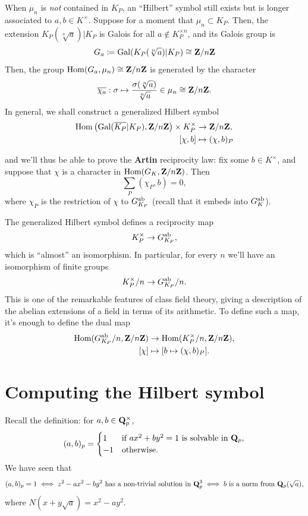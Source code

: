 \documentclass{article}
\begin{document}
When $\mu_n$ is \textit{not} contained in $K_P$, an ``Hilbert'' symbol still exists but is longer associated to $a,b\in K^\times$. Suppose for a moment that $\mu_n\subset K_P$. Then, the extension $K_P(\sqrt[n]{a})|K_P$ is Galois for all $a\notin K_P^{\times n}$, and its Galois group is
\[
	G_a\coloneqq\operatorname{Gal}(K_P(\sqrt[n]{a})|K_P) \cong \mathbf{Z}/n\mathbf{Z}
\]
Then, the group $ \operatorname{Hom}(G_a,\mu_n)\cong \mathbf{Z}/n\mathbf{Z}$ is generated by the character
\[
	\overline{\chi_a}:\sigma\mapsto \frac{\sigma(\sqrt[n]{a})}{\sqrt[n]{a}}\in \mu_n \cong \mathbf{Z}/n\mathbf{Z}.
\]
In general, we shall construct a generalized Hilbert symbol
\begin{align*}
	\operatorname{Hom}\left(\operatorname{Gal}(\overline{K_P}|K_P),\mathbf{Z}/n\mathbf{Z}\right) \times K_P^\times & \to \mathbf{Z}/n\mathbf{Z},        \\
	[\chi,b]                                                           & \mapsto (\chi,b)_P
\end{align*}

and we'll thus be able to prove the \textbf{Artin} reciprocity law: fix some $b\in K^\times$, and suppose that $\chi$ is a character in $\operatorname{Hom}(G_K,\mathbf{Z}/n\mathbf{Z})$. Then
\[
	\sum_P (\chi_P,b)=0,
\]
where $\chi_P$ is the restriction of $\chi$ to $G_{K_P}^{\text{ab}}$ (recall that it embeds into $G_K^{\text{ab}}$).

The generalized Hilbert symbol defines a reciprocity map
\[
	K_P^\times \to G_{K_P}^{\text{ab}},
\]
which is ``almost'' an isomorphism. In particular, for every $n$ we'll have an isomorphism of finite groups
\[
	K_P^\times/n \to G_{K_P}^{\text{ab}}/n.
\]
This is one of the remarkable features of class field theory, giving a description of the abelian extensions of a field in terms of its arithmetic.
To define such a map, it's enough to define the dual map
\begin{align*}
	\operatorname{Hom}(G_{K_P}^{\text{ab}}/n,\mathbf{Z}/n\mathbf{Z}) & \to \operatorname{Hom}(K_P^\times/n,\mathbf{Z}/n\mathbf{Z}), \\
	[\chi]                     & \mapsto [b\mapsto (\chi,b)_P].
\end{align*}

\section{Computing the Hilbert symbol}

Recall the definition: for $a,b\in\mathbf{Q}_p^\times$,
\[
	(a,b)_p = \begin{cases}
		1  & \text{if $ax^2+by^2=1$ is solvable in $\mathbf{Q}_p$}, \\
		-1 & \text{otherwise}.
	\end{cases}
\]
We have seen that
\[
	(a,b)_p = 1 \iff z^2 - ax^2 - by^2 \text{ has a non-trivial solution in } \mathbf{Q}_p^3 \iff b \text{ is a norm from } \mathbf{Q}_p(\sqrt{a}),
\]
where $N(x+y\sqrt{a}) = x^2 - ay^2$.
\end{document}
